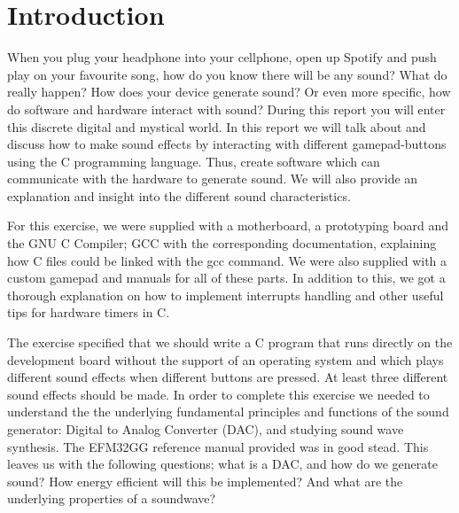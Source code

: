 \chapter{Introduction}

When you plug your headphone into your cellphone, open up Spotify and push play
on your favourite song, how do you know there will be any sound? What do really
happen? How does your device generate sound? Or even more specific, how do
software and hardware interact with sound? During this report you will enter
this discrete digital and mystical world. In this report we will talk about and
discuss how to make sound effects by interacting with different gamepad-buttons
using the C programming language. Thus, create software which can communicate
with the hardware to generate sound. We will also provide an explanation and
insight into the different sound characteristics.

For this exercise, we were supplied with a motherboard, a prototyping board and
the GNU C Compiler; GCC with the corresponding documentation, explaining how C
files could be linked with the gcc command. We were also supplied with a custom
gamepad and manuals for all of these parts. In addition to this, we got a
thorough explanation on how to implement interrupts handling and other useful
tips for hardware timers in C.

The exercise specified that we should write a C program that runs directly on
the development board without the support of an operating system and which plays
different sound effects when different buttons are pressed. At least three
different sound effects should be made. In order to complete this exercise we
needed to understand the the underlying fundamental principles and functions of
the sound generator: Digital to Analog Converter (DAC), and studying sound wave
synthesis. The EFM32GG reference manual provided was in good stead. This leaves
us with the following questions; what is a DAC, and how do we generate sound?
How energy efficient will this be implemented? And what are the underlying
properties of a soundwave?
